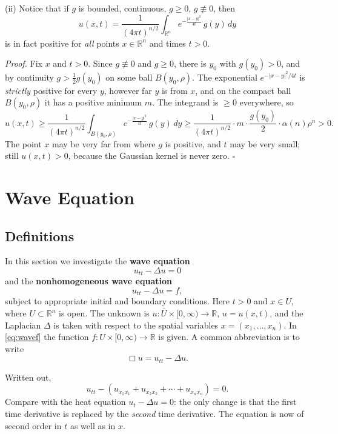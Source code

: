 \documentclass[11pt]{article}
\theoremstyle{plain}
\theoremstyle{definition}
\theoremstyle{remark}
\begin{document}
(ii) Notice that if $g$ is bounded, continuous, $g \geq 0$, $g \not\equiv 0$, then
$$ u(x,t) = \frac{1}{(4\pi t)^{n/2}}\int_{\mathbb{R}^n}e^{-\frac{|x-y|^2}{4t}}\, g(y)\, dy $$
is in fact positive for \emph{all} points $x \in \mathbb{R}^n$ and times $t > 0$.

\emph{Proof.} Fix $x$ and $t > 0$. Since $g \not\equiv 0$ and $g \geq 0$, there is $y_0$ with $g(y_0) > 0$, and by continuity $g > \frac12 g(y_0)$ on some ball $B(y_0,\rho)$. The exponential $e^{-|x-y|^2/4t}$ is \emph{strictly} positive for every $y$, however far $y$ is from $x$, and on the compact ball $B(y_0,\rho)$ it has a positive minimum $m$. The integrand is $\geq 0$ everywhere, so
$$ u(x,t) \geq \frac{1}{(4\pi t)^{n/2}}\int_{B(y_0,\rho)} e^{-\frac{|x-y|^2}{4t}}\, g(y)\, dy \geq \frac{1}{(4\pi t)^{n/2}}\cdot m\cdot\frac{g(y_0)}{2}\cdot\alpha(n)\rho^n > 0. $$
The point $x$ may be very far from where $g$ is positive, and $t$ may be very small; still $u(x,t) > 0$, because the Gaussian kernel is never zero. $\square$

\newpage
\section{Wave Equation}\label{sec:wave}

\subsection{Definitions}\label{ssec:wavedef}

In this section we investigate the \textbf{wave equation}
\begin{equation}\label{eq:wave}
u_{tt} - \Delta u = 0
\end{equation}
and the \textbf{nonhomogeneous wave equation}
\begin{equation}\label{eq:wavef}
u_{tt} - \Delta u = f,
\end{equation}
subject to appropriate initial and boundary conditions. Here $t > 0$ and $x \in U$, where $U \subset \mathbb{R}^n$ is open. The unknown is $u : \bar U \times [0,\infty) \to \mathbb{R}$, $u = u(x,t)$, and the Laplacian $\Delta$ is taken with respect to the spatial variables $x = (x_1,\dots,x_n)$. In \eqref{eq:wavef} the function $f : U \times [0,\infty) \to \mathbb{R}$ is given. A common abbreviation is to write
$$ \Box u = u_{tt} - \Delta u. $$

Written out,
$$ u_{tt} - (u_{x_1x_1} + u_{x_2x_2} + \cdots + u_{x_nx_n}) = 0. $$
Compare with the heat equation $u_t - \Delta u = 0$: the only change is that the first time derivative is replaced by the \emph{second} time derivative. The equation is now of second order in $t$ as well as in $x$.
\end{document}
